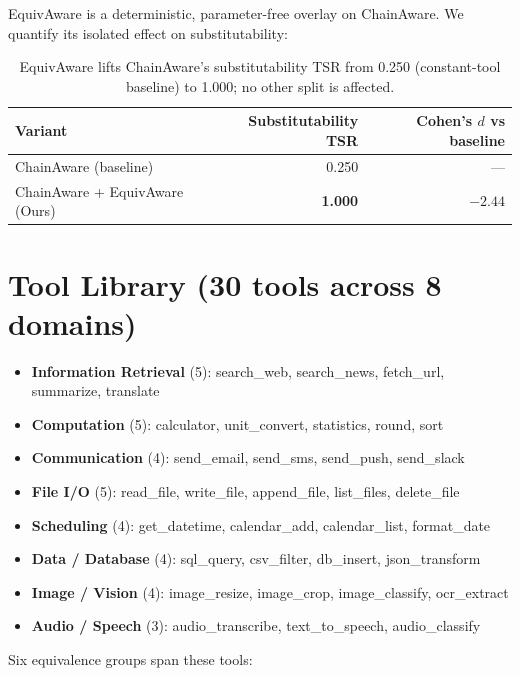 \documentclass[10pt]{article}
\begin{document}
EquivAware is a deterministic, parameter-free overlay on ChainAware. We
quantify its isolated effect on substitutability:

\begin{table}[h]
    \centering
    \small
    \begin{tabular}{lrr}
        \toprule
        Variant & Substitutability TSR & Cohen's $d$ vs baseline \\
        \midrule
        ChainAware (baseline)            & 0.250 & --- \\
        ChainAware + EquivAware (Ours)   & \textbf{1.000} & $-2.44$ \\
        \bottomrule
    \end{tabular}
    \caption{EquivAware lifts ChainAware's substitutability TSR from 0.250 (constant-tool baseline) to 1.000; no other split is affected.}
    \label{tab:equiv-ablation}
\end{table}

\section{Tool Library (30 tools across 8 domains)}
\label{app:tools}

\begin{itemize}
    \item \textbf{Information Retrieval} (5): search\_web, search\_news, fetch\_url, summarize, translate
    \item \textbf{Computation} (5): calculator, unit\_convert, statistics, round, sort
    \item \textbf{Communication} (4): send\_email, send\_sms, send\_push, send\_slack
    \item \textbf{File I/O} (5): read\_file, write\_file, append\_file, list\_files, delete\_file
    \item \textbf{Scheduling} (4): get\_datetime, calendar\_add, calendar\_list, format\_date
    \item \textbf{Data / Database} (4): sql\_query, csv\_filter, db\_insert, json\_transform
    \item \textbf{Image / Vision} (4): image\_resize, image\_crop, image\_classify, ocr\_extract
    \item \textbf{Audio / Speech} (3): audio\_transcribe, text\_to\_speech, audio\_classify
\end{itemize}

Six equivalence groups span these tools:
\end{document}
